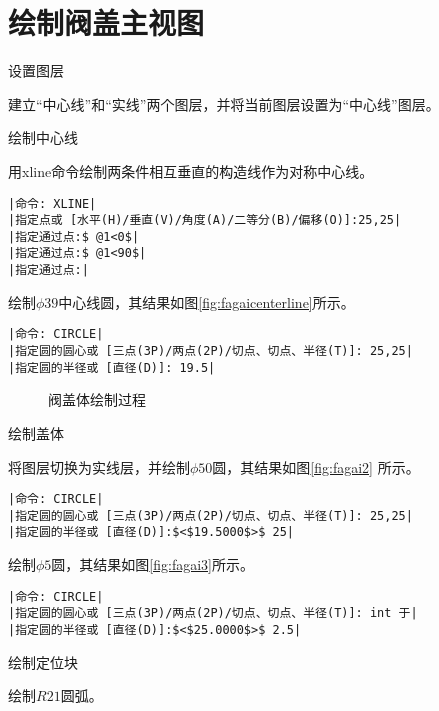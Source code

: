 \section{绘制阀盖主视图}
\begin{procedure}
\item 设置图层

建立“中心线”和“实线”两个图层，并将当前图层设置为“中心线”图层。
\item 绘制中心线

用xline命令绘制两条件相互垂直的构造线作为对称中心线。
\begin{lstlisting}
|命令: XLINE|
|指定点或 [水平(H)/垂直(V)/角度(A)/二等分(B)/偏移(O)]:25,25|
|指定通过点:$ @1<0$|
|指定通过点:$ @1<90$|
|指定通过点:|
\end{lstlisting}
绘制$\phi 39$中心线圆，其结果如图\ref{fig:fagaicenterline}所示。
\begin{lstlisting}
|命令: CIRCLE|
|指定圆的圆心或 [三点(3P)/两点(2P)/切点、切点、半径(T)]: 25,25|
|指定圆的半径或 [直径(D)]: 19.5|
\end{lstlisting}
\begin{figure}[htbp]
\centering
{}\hspace{30pt}
\hspace{30pt}
\caption{阀盖体绘制过程}
\end{figure}
\item 绘制盖体

将图层切换为实线层，并绘制$\phi 50$圆，其结果如图\ref{fig:fagai2} 所示。
\begin{lstlisting}
|命令: CIRCLE|
|指定圆的圆心或 [三点(3P)/两点(2P)/切点、切点、半径(T)]: 25,25|
|指定圆的半径或 [直径(D)]:$<$19.5000$>$ 25|
\end{lstlisting}
绘制$\phi 5$圆，其结果如图\ref{fig:fagai3}所示。
\begin{lstlisting}
|命令: CIRCLE|
|指定圆的圆心或 [三点(3P)/两点(2P)/切点、切点、半径(T)]: int 于|
|指定圆的半径或 [直径(D)]:$<$25.0000$>$ 2.5|
\end{lstlisting}
\item 绘制定位块

绘制$R21$圆弧。


\end{procedure}
